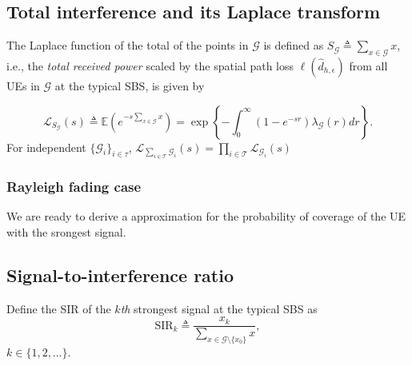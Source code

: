 \documentclass[conference]{IEEEtran}
\theoremstyle{definition}
\theoremstyle{plain}
\begin{document}
          \subsection{Total interference and its Laplace transform}

          The Laplace function of the total of the points in $\mathcal{G}$ is defined as $S_{\mathcal{G}} \triangleq \sum_{x \in \mathcal{G}}x$, i.e., the \textit{total received power} scaled by the spatial path loss $\ell(\hat{d}_{h,\epsilon})$ from all UEs in $\mathcal{G}$ at the typical SBS, is given by

          \begin{equation}
            \label{eq:lapdef}
            \mathcal{L}_{S_{\mathcal{G}}}(s)\triangleq \mathbb{E}\left(e^{-s\sum\limits_{x \in \mathcal{G}}x}\right)= \exp\left\{-\int_0^{\infty}(1-e^{-sr}) \lambda_{\mathcal{G}}(r) dr \right\}.
          \end{equation}
          For independent $\{\mathcal{G}_i\}_{i \in \mathcal{\tau}}$, $\mathcal{L}_{\sum_{i \in \mathcal{T}} \mathcal{G}_i}(s) = \prod_{i \in \mathcal{T}} \mathcal{L}_{\mathcal{G}_i}(s)$

          
          \subsubsection{Rayleigh fading case}
          
          We are ready to derive a approximation for the probability of coverage of the UE with the srongest signal.

          \subsection{Signal-to-interference ratio}
          Define the SIR of the $k$\textit{th} strongest signal at the typical SBS as
          \begin{equation}
            \text{SIR}_k \triangleq \frac{x_k}{\sum\limits_{x \in \mathcal{G} \setminus \{x_0\}}x},
          \end{equation}
          $k\in\{1,2,\dots\}$.
            
\end{document}

